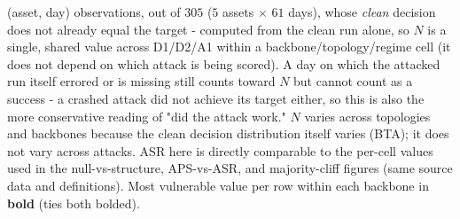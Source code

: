 \begin{table}[t]
{(asset, day) observations, out of $305$ ($5$ assets $\times$ $61$ days),
whose \emph{clean} decision does not already equal the target - computed
from the clean run alone, so $N$ is a single, shared value across D1/D2/A1
within a backbone/topology/regime cell (it does not depend on which attack is
being scored). A day on which the attacked run itself errored or is missing
still counts toward $N$ but cannot count as a success - a crashed attack
did not achieve its target either, so this is also the more conservative
reading of "did the attack work." $N$ varies across topologies and backbones
because the clean decision distribution itself varies (BTA); it does not
vary across attacks. ASR here is directly comparable to the per-cell values
used in the null-vs-structure, APS-vs-ASR, and majority-cliff figures (same
source data and definitions). Most vulnerable value per row within each
backbone in \textbf{bold} (ties both bolded).}
\label{tab:struct_main}
\end{table}
